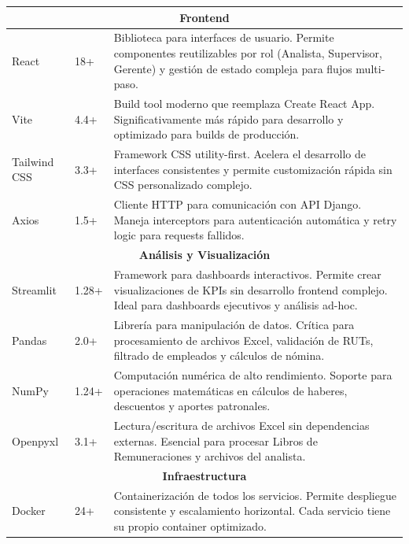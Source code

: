 \begin{longtable}{|p{3cm}|p{3cm}|p{7cm}|}
\multicolumn{3}{|c|}{\textbf{Frontend}} \\
\hline

React & 18+ & Biblioteca para interfaces de usuario. Permite componentes reutilizables por rol (Analista, Supervisor, Gerente) y gestión de estado compleja para flujos multi-paso. \\
\hline

Vite & 4.4+ & Build tool moderno que reemplaza Create React App. Significativamente más rápido para desarrollo y optimizado para builds de producción. \\
\hline

Tailwind CSS & 3.3+ & Framework CSS utility-first. Acelera el desarrollo de interfaces consistentes y permite customización rápida sin CSS personalizado complejo. \\
\hline

Axios & 1.5+ & Cliente HTTP para comunicación con API Django. Maneja interceptors para autenticación automática y retry logic para requests fallidos. \\
\hline

\multicolumn{3}{|c|}{\textbf{Análisis y Visualización}} \\
\hline

Streamlit & 1.28+ & Framework para dashboards interactivos. Permite crear visualizaciones de KPIs sin desarrollo frontend complejo. Ideal para dashboards ejecutivos y análisis ad-hoc. \\
\hline

Pandas & 2.0+ & Librería para manipulación de datos. Crítica para procesamiento de archivos Excel, validación de RUTs, filtrado de empleados y cálculos de nómina. \\
\hline

NumPy & 1.24+ & Computación numérica de alto rendimiento. Soporte para operaciones matemáticas en cálculos de haberes, descuentos y aportes patronales. \\
\hline

Openpyxl & 3.1+ & Lectura/escritura de archivos Excel sin dependencias externas. Esencial para procesar Libros de Remuneraciones y archivos del analista. \\
\hline

\multicolumn{3}{|c|}{\textbf{Infraestructura}} \\
\hline

Docker & 24+ & Containerización de todos los servicios. Permite despliegue consistente y escalamiento horizontal. Cada servicio tiene su propio container optimizado. \\
\hline


\end{longtable}
